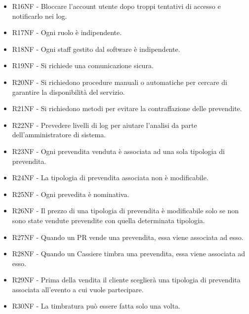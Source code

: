 \documentclass[a4paper]{article}
\begin{document}
\begin{itemize}
	\item R16NF - Bloccare l'account utente dopo troppi tentativi di accesso e notificarlo nei log.
	
	\item R17NF - Ogni ruolo è indipendente.
	\item R18NF - Ogni staff gestito dal software è indipendente.
	
	\item R19NF - Si richiede una comunicazione sicura.
	
	\item R20NF - Si richiedono procedure manuali o automatiche per cercare di garantire la disponibilità del servizio.
	
	\item R21NF - Si richiedono metodi per evitare la contraffazione delle prevendite.
	
	\item R22NF - Prevedere livelli di log per aiutare l'analisi da parte dell'amministratore di sistema.
	
	\item R23NF - Ogni prevendita venduta è associata ad una sola tipologia di prevendita.
	\item R24NF - La tipologia di prevendita associata non è modificabile.
	\item R25NF - Ogni prevedita è nominativa.
	
	\item R26NF - Il prezzo di una tipologia di prevendita è modificabile solo se non sono state vendute prevendite con quella determinata tipologia.
	
	\item R27NF - Quando un PR vende una prevendita, essa viene associata ad esso.
	\item R28NF - Quando un Cassiere timbra una prevendita, essa viene associata ad esso.
	
	\item R29NF - Prima della vendita il cliente sceglierà una tipologia di prevendita associata all'evento a cui vuole partecipare.
	
	\item R30NF - La timbratura può essere fatta solo una volta.
	
	
\end{itemize}
\end{document}
